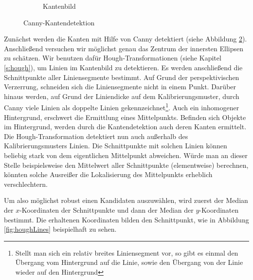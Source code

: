 \begin{figure}[!htb]
\begin{subfigure}{.5\textwidth}
		\caption{Kantenbild}
		\label{fig:afterCanny}
	\end{subfigure}
	\caption{Canny-Kantendetektion}
	\label{fig:canny}
\end{figure}

Zunächst werden die Kanten mit Hilfe von Canny \cite{Canny1986} detektiert (siehe Abbildung \ref{fig:canny}).
Anschließend versuchen wir möglichst genau das Zentrum der innersten Ellipsen zu schätzen.
Wir benutzen dafür Hough-Transformationen (siehe Kapitel \ref{s:hough}), um Linien im Kantenbild zu detektieren.
Es werden anschließend die Schnittpunkte aller Liniensegmente bestimmt. Auf Grund der perspektivischen Verzerrung, schneiden sich die Liniensegmente nicht in einem Punkt.
Darüber hinaus werden, auf Grund der Liniendicke auf dem Kalibrierungsmuster, durch Canny viele Linien als doppelte Linien gekennzeichnet\footnote{Stellt man sich ein relativ breites Liniensegment vor, so gibt es einmal den Übergang vom Hintergrund auf die Linie, sowie den Übergang von der Linie wieder auf den Hintergrund}. Auch ein inhomogener Hintergrund, erschwert die Ermittlung eines Mittelpunkts. Befinden sich Objekte im Hintergrund, werden durch die Kantendetektion auch deren Kanten ermittelt. Die Hough-Transformation detektiert nun auch außerhalb des Kalibrierungsmusters Linien. Die Schnittpunkte mit solchen Linien können beliebig stark von dem eigentlichen Mittelpunkt abweichen. Würde man an dieser Stelle beispielsweise den Mittelwert aller Schnittpunkte (elementweise) berechnen, könnten solche Ausreißer die Lokalisierung des Mittelpunkts erheblich verschlechtern.

Um also möglichst robust einen Kandidaten auszuwählen, wird zuerst der Median der $x$-Koordinaten der Schnittpunkte und dann der Median der $y$-Koordinaten bestimmt. Die erhaltenen Koordinaten bilden den Schnittpunkt, wie in Abbildung \ref{fig:houghLines} beispielhaft zu sehen.

